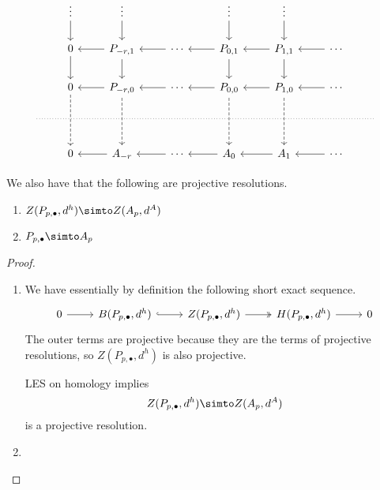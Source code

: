 \documentclass[main.tex]{subfiles}
\begin{document}
\begin{equation*}
  \begin{tikzcd}
    & \vdots
    \arrow[d]
    & \vdots
    \arrow[d]
    && \vdots
    \arrow[d]
    & \vdots
    \arrow[d]
    \\
    & 0
    \arrow[r, leftarrow]
    \arrow[d]
    & P_{-r,1}
    \arrow[r, leftarrow]
    \arrow[d]
    & \cdots
    \arrow[r, leftarrow]
    & P_{0,1}
    \arrow[r, leftarrow]
    \arrow[d]
    & P_{1,1}
    \arrow[r, leftarrow]
    \arrow[d]
    & \cdots
    \\
    & 0
    \arrow[r, leftarrow]
    \arrow[dd, dashed]
    & P_{-r,0}
    \arrow[r, leftarrow]
    \arrow[dd, dashed]
    & \cdots
    \arrow[r, leftarrow]
    & P_{0,0}
    \arrow[r, leftarrow]
    \arrow[dd, dashed]
    & P_{1,0}
    \arrow[r, leftarrow]
    \arrow[dd, dashed]
    & \cdots
    \\
    \
    \arrow[rrrrrrr, dotted, no head]
    &&&&&&& \
    \\
    & 0
    \arrow[r, leftarrow]
    & A_{-r}
    \arrow[r, leftarrow]
    & \cdots
    \arrow[r, leftarrow]
    & A_{0}
    \arrow[r, leftarrow]
    & A_{1}
    \arrow[r, leftarrow]
    & \cdots
  \end{tikzcd}
\end{equation*}

\begin{proposition}
  We also have that the following are projective resolutions.
  \begin{enumerate}
    \item $Z(P_{p,\bullet}, d^{h}) \simto Z(A_{p}, d^{A})$

    \item $P_{p,\bullet} \simto A_{p}$
  \end{enumerate}
\end{proposition}
\begin{proof}
  \leavevmode
  \begin{enumerate}
    \item We have essentially by definition the following short exact sequence.
      \begin{equation*}
        \begin{tikzcd}
          0
          \arrow[r]
          & B(P_{p, \bullet}, d^{h})
          \arrow[r, hook]
          & Z(P_{p, \bullet}, d^{h})
          \arrow[r, two heads]
          & H(P_{p, \bullet}, d^{h})
          \arrow[r]
          & 0
        \end{tikzcd}
      \end{equation*}
      The outer terms are projective because they are the terms of projective resolutions, so $Z(P_{p,\bullet}, d^{h})$ is also projective.

      LES on homology implies
      \begin{equation*}
        Z(P_{p,\bullet}, d^{h}) \simto Z(A_{p}, d^{A})
      \end{equation*}
      is a projective resolution.

    \item
  \end{enumerate}
\end{proof}
\end{document}

